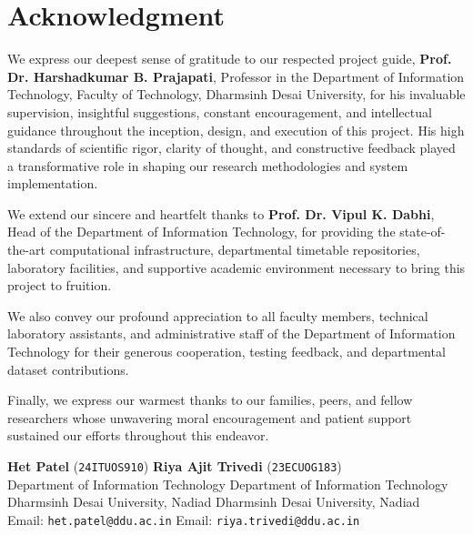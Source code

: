 \documentclass[12pt,letterpaper]{report}
\begin{document}
\newpage
\chapter*{Acknowledgment}

We express our deepest sense of gratitude to our respected project guide, \textbf{Prof. Dr. Harshadkumar B. Prajapati}, Professor in the Department of Information Technology, Faculty of Technology, Dharmsinh Desai University, for his invaluable supervision, insightful suggestions, constant encouragement, and intellectual guidance throughout the inception, design, and execution of this project. His high standards of scientific rigor, clarity of thought, and constructive feedback played a transformative role in shaping our research methodologies and system implementation.

We extend our sincere and heartfelt thanks to \textbf{Prof. Dr. Vipul K. Dabhi}, Head of the Department of Information Technology, for providing the state-of-the-art computational infrastructure, departmental timetable repositories, laboratory facilities, and supportive academic environment necessary to bring this project to fruition.

We also convey our profound appreciation to all faculty members, technical laboratory assistants, and administrative staff of the Department of Information Technology for their generous cooperation, testing feedback, and departmental dataset contributions.

Finally, we express our warmest thanks to our families, peers, and fellow researchers whose unwavering moral encouragement and patient support sustained our efforts throughout this endeavor.

\vspace{2.0cm}

\noindent \textbf{Het Patel} (\texttt{24ITUOS910}) \hfill \textbf{Riya Ajit Trivedi} (\texttt{23ECUOG183})\\
\noindent Department of Information Technology \hfill Department of Information Technology\\
\noindent Dharmsinh Desai University, Nadiad \hfill Dharmsinh Desai University, Nadiad\\
\noindent Email: \texttt{het.patel@ddu.ac.in} \hfill Email: \texttt{riya.trivedi@ddu.ac.in}
\end{document}
